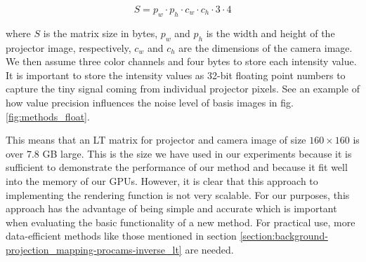 \begin{equation}
    \label{eq:lt_matrix_size}
    S = p_w \cdot p_h \cdot c_w \cdot c_h \cdot 3 \cdot 4
\end{equation}

where \(S\) is the matrix size in bytes, \(p_w\) and \(p_h\) is the width and height of the projector image, respectively, \(c_w\) and \(c_h\) are the dimensions of the camera image. We then assume three color channels and four bytes to store each intensity value. It is important to store the intensity values as 32-bit floating point numbers to capture the tiny signal coming from individual projector pixels. See an example of how value precision influences the noise level of basis images in fig. \ref{fig:methods_float}.

This means that an LT matrix for projector and camera image of size \(160 \times 160\) is over 7.8 GB large. This is the size we have used in our experiments because it is sufficient to demonstrate the performance of our method and because it fit well into the memory of our GPUs. However, it is clear that this approach to implementing the rendering function is not very scalable. For our purposes, this approach has the advantage of being simple and accurate which is important when evaluating the basic functionality of a new method. For practical use, more data-efficient methods like those mentioned in section \ref{section:background-projection_mapping-procams-inverse_lt} are needed.

